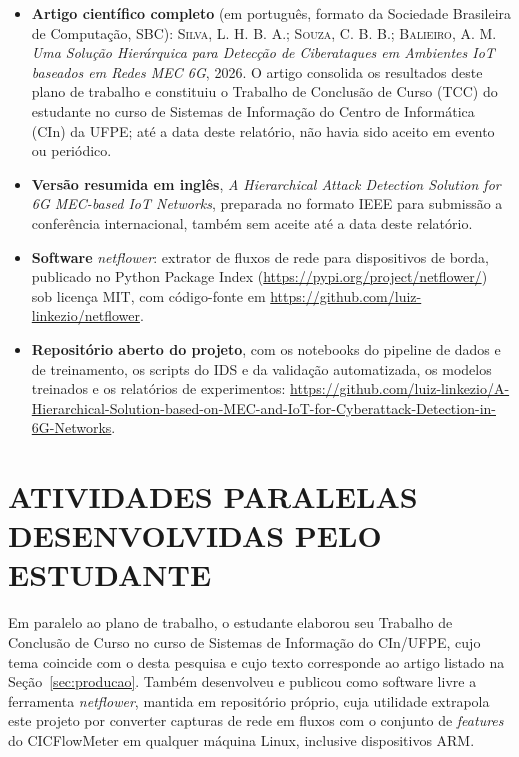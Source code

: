 \documentclass[12pt,a4paper]{article}
\begin{document}
\begin{itemize}
  \item \textbf{Artigo científico completo} (em português, formato da Sociedade
    Brasileira de Computação, SBC): \textsc{Silva}, L. H. B. A.; \textsc{Souza},
    C. B. B.; \textsc{Balieiro}, A. M. \textit{Uma Solução Hierárquica para
    Detecção de Ciberataques em Ambientes IoT baseados em Redes MEC 6G}, 2026.
    O artigo consolida os resultados deste plano de trabalho e constituiu o
    Trabalho de Conclusão de Curso (TCC) do estudante no curso de Sistemas de
    Informação do Centro de Informática (CIn) da UFPE; até a data deste
    relatório, não havia sido aceito em evento ou periódico.
  \item \textbf{Versão resumida em inglês}, \textit{A Hierarchical Attack
    Detection Solution for 6G MEC-based IoT Networks}, preparada no formato
    IEEE para submissão a conferência internacional, também sem aceite até a
    data deste relatório.
  \item \textbf{Software} \textit{netflower}: extrator de fluxos de rede para
    dispositivos de borda, publicado no Python Package Index
    (\url{https://pypi.org/project/netflower/}) sob licença MIT, com
    código-fonte em \url{https://github.com/luiz-linkezio/netflower}.
  \item \textbf{Repositório aberto do projeto}, com os notebooks do pipeline de
    dados e de treinamento, os scripts do IDS e da validação automatizada, os
    modelos treinados e os relatórios de experimentos:
    \url{https://github.com/luiz-linkezio/A-Hierarchical-Solution-based-on-MEC-and-IoT-for-Cyberattack-Detection-in-6G-Networks}.
\end{itemize}

\section{ATIVIDADES PARALELAS DESENVOLVIDAS PELO ESTUDANTE}
\label{sec:paralelas}

Em paralelo ao plano de trabalho, o estudante elaborou seu Trabalho de
Conclusão de Curso no curso de Sistemas de Informação do CIn/UFPE, cujo tema
coincide com o desta pesquisa e cujo texto corresponde ao artigo listado na
Seção~\ref{sec:producao}. Também desenvolveu e publicou como software livre a
ferramenta \textit{netflower}, mantida em repositório próprio, cuja utilidade
extrapola este projeto por converter capturas de rede em fluxos com o conjunto
de \textit{features} do CICFlowMeter em qualquer máquina Linux, inclusive
dispositivos ARM.
\end{document}
